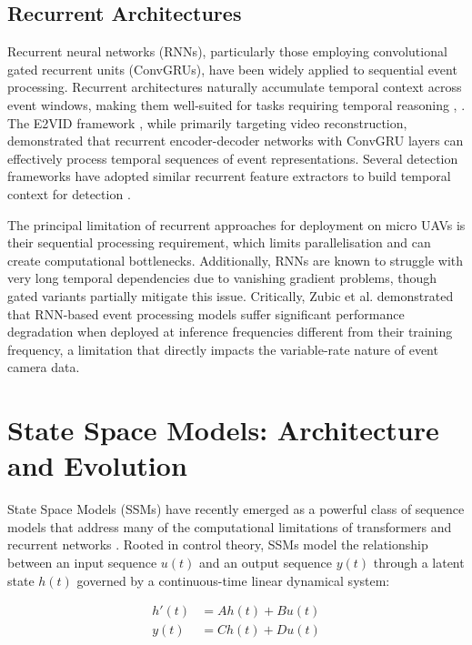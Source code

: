 \documentclass[11pt, a4paper]{report}
\begin{document}
\subsection{Recurrent Architectures}
Recurrent neural networks (RNNs), particularly those employing convolutional gated recurrent units (ConvGRUs), have been widely applied to sequential event processing. Recurrent architectures naturally accumulate temporal context across event windows, making them well-suited for tasks requiring temporal reasoning \cite{rebecq2019e2vid}, \cite{cannici2019attention}. The E2VID framework \cite{rebecq2019e2vid}, while primarily targeting video reconstruction, demonstrated that recurrent encoder-decoder networks with ConvGRU layers can effectively process temporal sequences of event representations. Several detection frameworks have adopted similar recurrent feature extractors to build temporal context for detection \cite{messikommer2020event}. 

The principal limitation of recurrent approaches for deployment on micro UAVs is their sequential processing requirement, which limits parallelisation and can create computational bottlenecks. Additionally, RNNs are known to struggle with very long temporal dependencies due to vanishing gradient problems, though gated variants partially mitigate this issue. Critically, Zubic et al. \cite{zubic2024state} demonstrated that RNN-based event processing models suffer significant performance degradation when deployed at inference frequencies different from their training frequency, a limitation that directly impacts the variable-rate nature of event camera data. 

\section{State Space Models: Architecture and Evolution}
State Space Models (SSMs) have recently emerged as a powerful class of sequence models that address many of the computational limitations of transformers and recurrent networks \cite{gu2022efficiently}. Rooted in control theory, SSMs model the relationship between an input sequence $u(t)$ and an output sequence $y(t)$ through a latent state $h(t)$ governed by a continuous-time linear dynamical system:

\begin{align}
    h'(t) &= Ah(t) + Bu(t) \\
    y(t) &= Ch(t) + Du(t)
\end{align}
\end{document}

